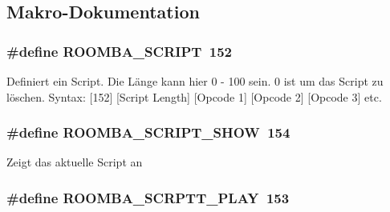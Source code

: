 \subsection{Makro-\/\-Dokumentation}
\hypertarget{group__roomba__commands__script_gaedc1545f209e018c642304017cfaf2fd}{
\subsubsection[{R\-O\-O\-M\-B\-A\-\_\-\-S\-C\-R\-I\-P\-T}]{\setlength{\rightskip}{0pt plus 5cm}\#define R\-O\-O\-M\-B\-A\-\_\-\-S\-C\-R\-I\-P\-T~152}}\label{group__roomba__commands__script_gaedc1545f209e018c642304017cfaf2fd}
Definiert ein Script. Die Länge kann hier 0 -\/ 100 sein. 0 ist um das Script zu löschen. Syntax\-: \mbox{[}152\mbox{]} \mbox{[}Script Length\mbox{]} \mbox{[}Opcode 1\mbox{]} \mbox{[}Opcode 2\mbox{]} \mbox{[}Opcode 3\mbox{]} etc. \hypertarget{group__roomba__commands__script_gaf2d55738cfa4028ef7e8d2dbf790fb89}{
\subsubsection[{R\-O\-O\-M\-B\-A\-\_\-\-S\-C\-R\-I\-P\-T\-\_\-\-S\-H\-O\-W}]{\setlength{\rightskip}{0pt plus 5cm}\#define R\-O\-O\-M\-B\-A\-\_\-\-S\-C\-R\-I\-P\-T\-\_\-\-S\-H\-O\-W~154}}\label{group__roomba__commands__script_gaf2d55738cfa4028ef7e8d2dbf790fb89}
Zeigt das aktuelle Script an \hypertarget{group__roomba__commands__script_ga707a46afb7619d327842a514a710564b}{
\subsubsection[{R\-O\-O\-M\-B\-A\-\_\-\-S\-C\-R\-P\-T\-T\-\_\-\-P\-L\-A\-Y}]{\setlength{\rightskip}{0pt plus 5cm}\#define R\-O\-O\-M\-B\-A\-\_\-\-S\-C\-R\-P\-T\-T\-\_\-\-P\-L\-A\-Y~153}}\label{group__roomba__commands__script_ga707a46afb7619d327842a514a710564b}
